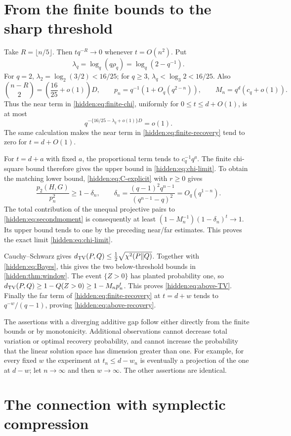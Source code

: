 \section{From the finite bounds to the sharp threshold}

Take $R=\lfloor n/5\rfloor$. Then
$tq^{-R}\to0$ whenever $t=O(n^2)$. Put
\[
 \lambda_q=\log_q(q\rho_q)=\log_q(2-q^{-1}).
\]
For $q=2$, $\lambda_2=\log_2(3/2)<16/25$; for $q\ge3$,
$\lambda_q<\log_3 2<16/25$. Also
\[
 \binom{n-R}{2}=\left(\frac{16}{25}+o(1)\right)D,
 \qquad p_n=q^{-1}(1+O_q(q^{2-n})),\qquad
 M_n=q^d(c_q+o(1)).
\]
Thus the near term in \eqref{hidden:eq:finite-chi}, uniformly for
$0\le t\le d+O(1)$, is at most
\[
 q^{-\{16/25-\lambda_q+o(1)\}D}=o(1).
\]
The same calculation makes the near term in
\eqref{hidden:eq:finite-recovery} tend to zero for $t=d+O(1)$.

For $t=d+a$ with fixed $a$, the proportional term tends to
$c_q^{-1}q^a$. The finite chi-square bound therefore gives the upper
bound in \eqref{hidden:eq:chi-limit}. To obtain the matching lower bound,
\eqref{hidden:eq:C-explicit} with $r\ge0$ gives
\[
 \frac{p_2(H,G)}{p_n^2}\ge1-\delta_n,\qquad
 \delta_n=\frac{(q-1)^2q^{n-1}}{(q^{n-1}-q)^2}=O_q(q^{1-n}).
\]
The total contribution of the unequal projective pairs to
\eqref{hidden:eq:secondmoment} is consequently at least
$(1-M_n^{-1})(1-\delta_n)^t\to1$. Its upper bound tends to one by
the preceding near/far estimates. This proves the exact limit
\eqref{hidden:eq:chi-limit}.

Cauchy--Schwarz gives
$d_{\rm TV}(P,Q)\le\tfrac12\sqrt{\chi^2(P\Vert Q)}$.
Together with \eqref{hidden:eq:Bayes}, this gives the two below-threshold
bounds in \cref{hidden:thm:window}. The event $\{Z>0\}$ has planted
probability one, so
$d_{\rm TV}(P,Q)\ge1-Q(Z>0)\ge1-M_np_n^t$.
This proves \eqref{hidden:eq:above-TV}. Finally the far term of
\eqref{hidden:eq:finite-recovery} at $t=d+w$ tends to
$q^{-w}/(q-1)$, proving \eqref{hidden:eq:above-recovery}.

The assertions with a diverging additive gap follow either directly from
the finite bounds or by monotonicity. Additional observations cannot
decrease total variation or optimal recovery probability, and cannot
increase the probability that the linear solution space has dimension
greater than one. For example, for every fixed $w$ the experiment at
$t_n\le d-w_n$ is eventually a projection of the one at $d-w$; let
$n\to\infty$ and then $w\to\infty$. The other assertions are identical.

\section{The connection with symplectic compression}

